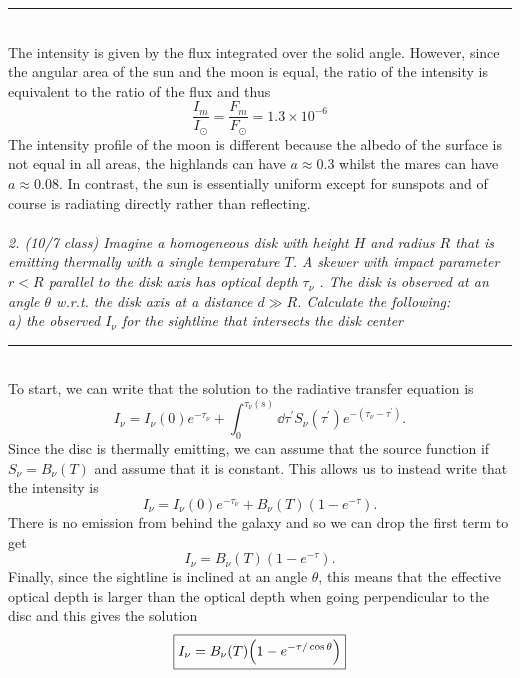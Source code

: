 \documentclass[12pt, letterpaper, twoside]{article}
\newcommand{\answer}[1]{
    \par\noindent\rule{\textwidth}{0.4pt}\\#1\\
}
\begin{document}
\answer{
    The intensity is given by the flux integrated over the solid angle. However, since the angular area of the sun and the moon is equal, the ratio of the intensity is equivalent to the ratio of the flux and thus
    \begin{equation}
        \boxed{ \frac{I_m}{I_\odot} = \frac{F_m}{F_\odot} = 1.3 \times 10^{-6} }    
    \end{equation}
    The intensity profile of the moon is different because the albedo of the surface is not equal in all areas, the highlands can have $a \approx 0.3$ whilst the mares can have $a \approx 0.08$. In contrast, the sun is essentially uniform except for sunspots and of course is radiating directly rather than reflecting.\\
}

{\it 2. {\it (10/7 class)} Imagine a homogeneous disk with height $H$ and radius $R$ that is emitting thermally with a single temperature $T$.  A skewer with impact parameter $r<R$ parallel to the disk axis has optical depth $\tau_\nu$ .  The disk is observed at an angle $\theta$ w.r.t. the disk axis at a distance $d \gg R$.  Calculate the following: \\
a)  the observed $I_\nu$ for the sightline that intersects the disk center}

\answer{
    To start, we can write that the solution to the radiative transfer equation is
    \begin{equation}
        I_\nu = I_\nu(0) e^{-\tau_\nu} + \int_0^{\tau_\nu(s)} \dd{\tau^\prime} S_{\nu} (\tau^\prime) e^{-(\tau_\nu - \tau^{\prime})}.
    \end{equation}
    Since the disc is thermally emitting, we can assume that the source function if $S_\nu = B_\nu (T)$ and assume that it is constant. This allows us to instead write that the intensity is
    \begin{equation}
        I_\nu = I_\nu(0) e^{-\tau_\nu} + B_\nu(T) (1 - e^{-\tau}).
    \end{equation}
    There is no emission from behind the galaxy and so we can drop the first term to get
    \begin{equation}
        I_\nu = B_\nu(T) (1 - e^{-\tau}).
    \end{equation}
    Finally, since the sightline is inclined at an angle $\theta$, this means that the effective optical depth is larger than the optical depth when going perpendicular to the disc and this gives the solution
    \begin{equation}
        \boxed{ I_\nu = B_\nu(T) \qty(1 - e^{-\tau / \cos \theta}) }
    \end{equation}
}
\end{document}
